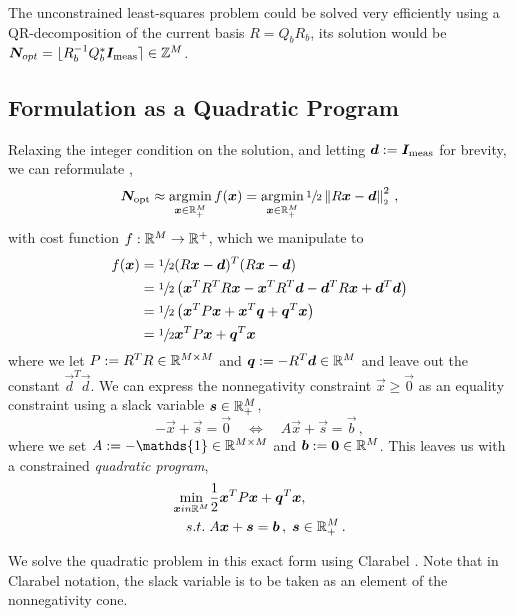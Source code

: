 The unconstrained least-squares problem could be solved very efficiently using a QR-decomposition of the current basis $R = Q_b R_b$, its solution would be $\vec{N}_{opt} = \lfloor R_b\inv Q_b^* \vec{I}_{\rm meas} \rceil \in \Z^M$.

\subsection{Formulation as a Quadratic Program}
Relaxing the integer condition on the solution, and letting $\vec{d} := \vec{I}_{\rm meas}$ for brevity, we can reformulate ,
$$\vec{N}_{\rm opt} \approx \argmin_{\vec{x} \in \R_+^M} f(\vec{x}) = \argmin_{\vec{x} \in \R_+^M} \sfrac{1}{2} \norm{R \vec{x} - \vec{d}}^2\,,$$
with cost function $f: \R^M \to \R^+$, which we manipulate to
\begin{align*}
  f(\vec{x}) & = \sfrac{1}{2} (R \vec{x} - \vec{d})^T (R \vec{x} - \vec{d})                                                          \\
             & = \sfrac{1}{2} \left(\vec{x}^T R^T R \vec{x} - \vec{x}^T R^T \vec{d} - \vec{d}^T R \vec{x} + \vec{d}^T \vec{d}\right) \\
             & = \sfrac{1}{2} \left(\vec{x}^T P \vec{x} + \vec{x}^T \vec{q} + \vec{q}^T \vec{x}\right)                               \\
             & = \sfrac{1}{2} \vec{x}^T P \vec{x} + \vec{q}^T \vec{x}
\end{align*}
where we let $P := R^T R \in \R^{M \times M}$ and $\vec{q} := -R^T \vec{d} \in \R^M$ and leave out the constant $\vec{d}^T \vec{d}$.
We can express the nonnegativity constraint $\vec{x} \ge \vec{0}$ as an equality constraint using a slack variable $\vec{s} \in \R_+^M$,
$$-\vec{x} + \vec{s} = \vec{0} \quad\Leftrightarrow\quad A \vec{x} + \vec{s} = \vec{b}\,,$$
where we set $A := -\mathds{1} \in \R^{M \times M}$ and $\vec{b} := \vec{0} \in \R^M$.
This leaves us with a constrained \textit{quadratic program},
\begin{align}
  \min_{\vec{x} in \R^M} & \frac{1}{2} \vec{x}^T P \vec{x} + \vec{q}^T \vec{x},     \\
  s.t.\;                 & A \vec{x} + \vec{s} = \vec{b}\,,\; \vec{s} \in \R_+^M\,.
\end{align}

We solve the quadratic problem in this exact form using Clarabel \cite{2024-clarabel}.
Note that in Clarabel notation, the slack variable is to be taken as an element of the nonnegativity cone.

